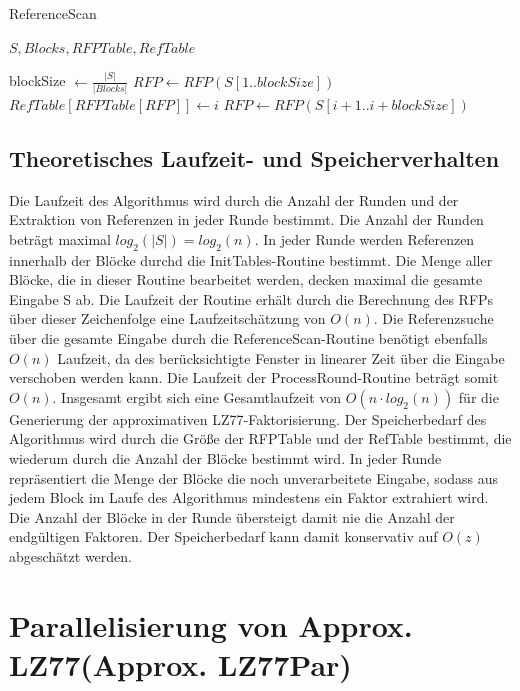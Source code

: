 \begin{algorithm}[ht]
\centering
\caption{ReferenceScan} \label{alg:refscan}
\algorithmicrequire $S, Blocks, RFPTable, RefTable$
\begin{algorithmic}
    \STATE blockSize $\gets \frac{|S|}{|Blocks|}$
    \STATE $RFP \gets RFP(S[1..blockSize])$
            \STATE $RefTable[RFPTable[RFP]] \gets i$
        \ENDIF
        \STATE $RFP \gets RFP(S[i+1..i+blockSize])$ 
    \ENDFOR
\end{algorithmic}
\end{algorithm}


\subsection{Theoretisches Laufzeit- und Speicherverhalten}
Die Laufzeit des Algorithmus wird durch die Anzahl der Runden und der Extraktion von Referenzen in jeder Runde bestimmt. Die Anzahl der Runden beträgt maximal $log_2(|S|)=log_2(n)$. In jeder Runde
werden Referenzen innerhalb der Blöcke durchd die InitTables-Routine bestimmt. Die Menge aller Blöcke, die in dieser Routine bearbeitet werden, decken maximal die gesamte Eingabe S ab. Die Laufzeit
der Routine erhält durch die Berechnung des RFPs über dieser Zeichenfolge eine Laufzeitschätzung von $O(n)$. Die Referenzsuche über die gesamte Eingabe durch die ReferenceScan-Routine benötigt ebenfalls
$O(n)$ Laufzeit, da des berücksichtigte Fenster in linearer Zeit über die Eingabe verschoben werden kann. Die Laufzeit der ProcessRound-Routine beträgt somit $O(n)$. Insgesamt ergibt sich eine
Gesamtlaufzeit von $O(n \cdot log_2(n))$ für die Generierung der approximativen LZ77-Faktorisierung. Der Speicherbedarf des Algorithmus wird durch die Größe der RFPTable und der RefTable bestimmt, die
wiederum durch die Anzahl der Blöcke bestimmt wird. In jeder Runde repräsentiert die Menge der Blöcke die noch unverarbeitete Eingabe, sodass aus jedem Block im Laufe des Algorithmus mindestens ein
Faktor extrahiert wird. Die Anzahl der Blöcke in der Runde übersteigt damit nie die Anzahl der endgültigen Faktoren. Der Speicherbedarf kann damit konservativ auf $O(z)$ abgeschätzt werden.

\section{Parallelisierung von Approx. LZ77(Approx. LZ77Par)}
